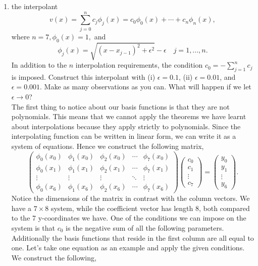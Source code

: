 \documentclass{article}
\begin{document}
\begin{enumerate}[label = {\arabic*}]
\begin{enumerate}
			\pagebreak
			
			\item the interpolant \[v(x) = \sum_{j = 0}^{n} c_j \phi_j(x) = c_0\phi_0(x) + \cdots + c_n \phi_n(x),\] where $n = 7, \phi_0(x) = 1,$ and \[\phi_j(x) = \sqrt{(x - x_{j - 1})^2 + \epsilon^2} - \epsilon \quad j = 1, ..., n.\] In addition to the $n$ interpolation requirements, the condition $c_0 = - \sum _{j = 1}^{n} c_j$ is imposed. Construct this interpolant with (i) $\epsilon = 0.1$, (ii) $\epsilon = 0.01$, and $\epsilon = 0.001$. Make as many observations as you can. What will happen if we let $\epsilon \rightarrow 0$? \\
			
			\hspace{15pt} The first thing to notice about our basis functions is that they are not polynomials. This means that we cannot apply the theorems we have learnt about interpolations because they apply strictly to polynomials. Since the interpolating function can be written in linear form, we can write it as a system of equations. Hence we construct the following matrix, 
				\[\begin{pmatrix}
				\phi_0(x_0) & \phi_1(x_0) & \phi_2(x_0)	& \cdots & \phi_7(x_0) \\
				\phi_0(x_1)	& \phi_1(x_1) & \phi_2(x_1)	& \cdots & \phi_7(x_1) \\
				\vdots      & \vdots	  & \vdots		& \ddots & \vdots 	   \\	
				\phi_0(x_6) & \phi_1(x_6) & \phi_2(x_6) & \cdots & \phi_7(x_6)
			\end{pmatrix}
			\begin{pmatrix}
				c_0    \\
				c_1    \\
				\vdots \\
				c_7
			\end{pmatrix} =
			\begin{pmatrix}
				y_0    \\
				y_1    \\
				\vdots \\
				y_6
			\end{pmatrix}.\]
			Notice the dimensions of the matrix in contrast with the column vectors. We have a $7 \times 8$ system, while the coefficient vector has length 8, both compared to the 7 y-coordinates we have. One of the conditions we can impose on the system is that $c_0$ is the negative sum of all the following parameters. Additionally the basis functions that reside in the first column are all equal to one. Let's take one equation as an example and apply the given conditions. We construct the following,

\end{enumerate}
\end{enumerate}
\end{document}
